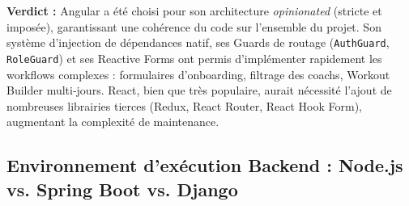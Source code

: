 \textbf{Verdict :} Angular a été choisi pour son architecture \textit{opinionated} (stricte et imposée), garantissant une cohérence du code sur l'ensemble du projet. Son système d'injection de dépendances natif, ses Guards de routage (\texttt{AuthGuard}, \texttt{RoleGuard}) et ses Reactive Forms ont permis d'implémenter rapidement les workflows complexes : formulaires d'onboarding, filtrage des coachs, Workout Builder multi-jours. React, bien que très populaire, aurait nécessité l'ajout de nombreuses librairies tierces (Redux, React Router, React Hook Form), augmentant la complexité de maintenance.

\subsection{Environnement d'exécution Backend : Node.js vs. Spring Boot vs. Django}

\begin{table}[H]
\centering
\renewcommand{\arraystretch}{1.4}
\caption{Comparaison des environnements backend -- Justification du choix Node.js}
\end{table}

